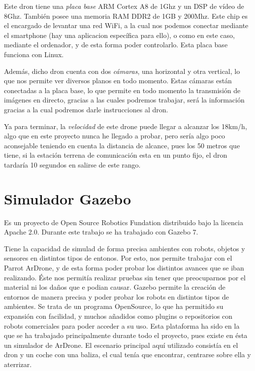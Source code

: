 \hspace{1 cm} Este dron tiene una \textsl{placa base} ARM Cortex A8 de 1Ghz y un DSP de v\'ideo de 8Ghz. Tambi\'en posee una memoria RAM DDR2 de 1GB y 200Mhz. Este chip es el encargado de levantar una red WiFi, a la cual nos podemos conectar mediante el smartphone (hay una aplicacion espec\'ifica para ello), o como en este caso, mediante el ordenador, y de esta forma poder controlarlo. Esta placa base funciona con Linux. 

\hspace{1 cm} Adem\'as, dicho dron cuenta con dos \textsl{c\'amaras}, una horizontal y otra vertical, lo que nos permite ver diversos planos en todo momento. Estas c\'amaras est\'an conectadas a la placa base, lo que permite en todo momento la transmisi\'on de im\'agenes en directo, gracias a las cuales podremos trabajar, ser\'a la informaci\'on gracias a la cual podremos darle instrucciones al dron. %

\hspace{1 cm} Ya para terminar, la \textsl{velocidad} de este drone puede llegar a alcanzar los 18km/h, algo que en este proyecto nunca he llegado a probar, pero ser\'ia algo poco aconsejable teniendo en cuenta la distancia de alcance, pues los 50 metros que tiene, si la estaci\'on terrena de comunicaci\'on esta en un punto fijo, el dron tardar\'ia 10 segundos en salirse de este rango. 


\section{Simulador Gazebo }
\hspace{1 cm} Es un proyecto de Open Source Robotics Fundation distribuido bajo la licencia Apache 2.0. Durante este trabajo se ha trabajado con Gazebo 7. 

\hspace{1 cm}Tiene la capacidad de simulad de forma precisa ambientes con robots, objetos y sensores en distintos tipos de entonos. Por esto, nos permite trabajar con el Parrot ArDrone, y de esta forma poder probar los distintos avances que se iban realizando. \'Este nos permit\'ia realizar pruebas sin tener que preocuparnos por el material ni los daños que e podian causar. Gazebo permite la creaci\'on de entornos de manera precisa y poder probar los robots en distintos tipos de ambientes. Se trata de un programa OpenSource, lo que ha permitido su expansi\'on con facilidad, y muchos añadidos como plugins o repositorios con robots comerciales para poder acceder a su uso. Esta plataforma ha sido en la que se ha trabajado principalmente durante todo el proyecto, pues existe en \'esta un simulador de ArDrone. El escenario principal aqu\'i utilizado consist\'ia en el dron y un coche con una baliza, el cual ten\'ia que encontrar, centrarse sobre ella y aterrizar.

